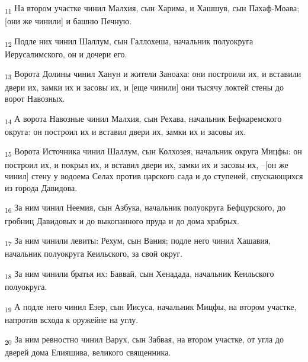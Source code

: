 \begin{tcolorbox}
\textsubscript{11} На втором участке чинил Малхия, сын Харима, и Хашшув, сын Пахаф-Моава; [они же чинили] и башню Печную.
\end{tcolorbox}
\begin{tcolorbox}
\textsubscript{12} Подле них чинил Шаллум, сын Галлохеша, начальник полуокруга Иерусалимского, он и дочери его.
\end{tcolorbox}
\begin{tcolorbox}
\textsubscript{13} Ворота Долины чинил Ханун и жители Заноаха: они построили их, и вставили двери их, замки их и засовы их, и [еще чинили] они тысячу локтей стены до ворот Навозных.
\end{tcolorbox}
\begin{tcolorbox}
\textsubscript{14} А ворота Навозные чинил Малхия, сын Рехава, начальник Бефкаремского округа: он построил их и вставил двери их, замки их и засовы их.
\end{tcolorbox}
\begin{tcolorbox}
\textsubscript{15} Ворота Источника чинил Шаллум, сын Колхозея, начальник округа Мицфы: он построил их, и покрыл их, и вставил двери их, замки их и засовы их, --[он же чинил] стену у водоема Селах против царского сада и до ступеней, спускающихся из города Давидова.
\end{tcolorbox}
\begin{tcolorbox}
\textsubscript{16} За ним чинил Неемия, сын Азбука, начальник полуокруга Бефцурского, до гробниц Давидовых и до выкопанного пруда и до дома храбрых.
\end{tcolorbox}
\begin{tcolorbox}
\textsubscript{17} За ним чинили левиты: Рехум, сын Вания; подле него чинил Хашавия, начальник полуокруга Кеильского, за свой округ.
\end{tcolorbox}
\begin{tcolorbox}
\textsubscript{18} За ним чинили братья их: Баввай, сын Хенадада, начальник Кеильского полуокруга.
\end{tcolorbox}
\begin{tcolorbox}
\textsubscript{19} А подле него чинил Езер, сын Иисуса, начальник Мицфы, на втором участке, напротив всхода к оружейне на углу.
\end{tcolorbox}
\begin{tcolorbox}
\textsubscript{20} За ним ревностно чинил Варух, сын Забвая, на втором участке, от угла до дверей дома Елияшива, великого священника.
\end{tcolorbox}
